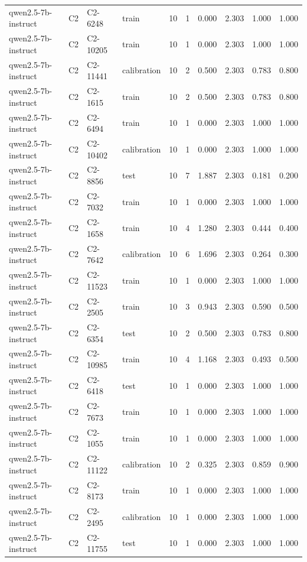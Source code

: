 \begin{table}
\begin{tabular}{llllrrrrrr}
qwen2.5-7b-instruct & C2 & C2-6248 & train & 10 & 1 & 0.000 & 2.303 & 1.000 & 1.000 \\
qwen2.5-7b-instruct & C2 & C2-10205 & train & 10 & 1 & 0.000 & 2.303 & 1.000 & 1.000 \\
qwen2.5-7b-instruct & C2 & C2-11441 & calibration & 10 & 2 & 0.500 & 2.303 & 0.783 & 0.800 \\
qwen2.5-7b-instruct & C2 & C2-1615 & train & 10 & 2 & 0.500 & 2.303 & 0.783 & 0.800 \\
qwen2.5-7b-instruct & C2 & C2-6494 & train & 10 & 1 & 0.000 & 2.303 & 1.000 & 1.000 \\
qwen2.5-7b-instruct & C2 & C2-10402 & calibration & 10 & 1 & 0.000 & 2.303 & 1.000 & 1.000 \\
qwen2.5-7b-instruct & C2 & C2-8856 & test & 10 & 7 & 1.887 & 2.303 & 0.181 & 0.200 \\
qwen2.5-7b-instruct & C2 & C2-7032 & train & 10 & 1 & 0.000 & 2.303 & 1.000 & 1.000 \\
qwen2.5-7b-instruct & C2 & C2-1658 & train & 10 & 4 & 1.280 & 2.303 & 0.444 & 0.400 \\
qwen2.5-7b-instruct & C2 & C2-7642 & calibration & 10 & 6 & 1.696 & 2.303 & 0.264 & 0.300 \\
qwen2.5-7b-instruct & C2 & C2-11523 & train & 10 & 1 & 0.000 & 2.303 & 1.000 & 1.000 \\
qwen2.5-7b-instruct & C2 & C2-2505 & train & 10 & 3 & 0.943 & 2.303 & 0.590 & 0.500 \\
qwen2.5-7b-instruct & C2 & C2-6354 & test & 10 & 2 & 0.500 & 2.303 & 0.783 & 0.800 \\
qwen2.5-7b-instruct & C2 & C2-10985 & train & 10 & 4 & 1.168 & 2.303 & 0.493 & 0.500 \\
qwen2.5-7b-instruct & C2 & C2-6418 & test & 10 & 1 & 0.000 & 2.303 & 1.000 & 1.000 \\
qwen2.5-7b-instruct & C2 & C2-7673 & train & 10 & 1 & 0.000 & 2.303 & 1.000 & 1.000 \\
qwen2.5-7b-instruct & C2 & C2-1055 & train & 10 & 1 & 0.000 & 2.303 & 1.000 & 1.000 \\
qwen2.5-7b-instruct & C2 & C2-11122 & calibration & 10 & 2 & 0.325 & 2.303 & 0.859 & 0.900 \\
qwen2.5-7b-instruct & C2 & C2-8173 & train & 10 & 1 & 0.000 & 2.303 & 1.000 & 1.000 \\
qwen2.5-7b-instruct & C2 & C2-2495 & calibration & 10 & 1 & 0.000 & 2.303 & 1.000 & 1.000 \\
qwen2.5-7b-instruct & C2 & C2-11755 & test & 10 & 1 & 0.000 & 2.303 & 1.000 & 1.000 \\

\end{tabular}
\end{table}
